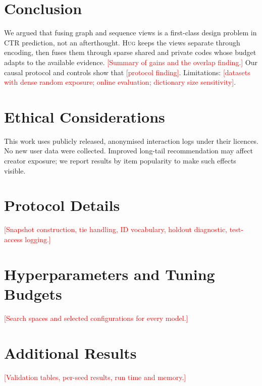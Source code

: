 \documentclass[sigconf,anonymous,review]{acmart}
\newcommand{\tbd}[1]{\textcolor{red}{[#1]}}
\newcommand{\method}{\textsc{Hug}}      %
\begin{document}
\section{Conclusion}
We argued that fusing graph and sequence views is a first-class design
problem in CTR prediction, not an afterthought. \method{} keeps the views
separate through encoding, then fuses them through sparse shared and private
codes whose budget adapts to the available evidence. \tbd{Summary of gains and
the overlap finding.} Our causal protocol and controls show that
\tbd{protocol finding}. Limitations: \tbd{datasets with dense random exposure;
online evaluation; dictionary size sensitivity}.

\section*{Ethical Considerations}
This work uses publicly released, anonymised interaction logs under their
licences. No new user data were collected. Improved long-tail recommendation
may affect creator exposure; we report results by item popularity to make such
effects visible.




\appendix
\section{Protocol Details}
\tbd{Snapshot construction, tie handling, ID vocabulary, holdout diagnostic,
test-access logging.}

\section{Hyperparameters and Tuning Budgets}
\tbd{Search spaces and selected configurations for every model.}

\section{Additional Results}
\tbd{Validation tables, per-seed results, run time and memory.}
\end{document}
